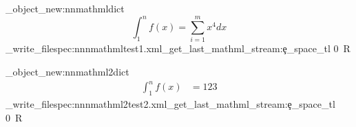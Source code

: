 \documentclass{article}
\begin{document}
\ExplSyntaxOn
\pdf_object_new:nn{mathml}{dict}
\ExplSyntaxOff
{}
\[
  \int_1^n f(x) = \sum_{i=1}^m x^4 dx
\]
\ExplSyntaxOn
\edef\blub{\luamml_get_last_mathml_stream:e{}\c_space_tl 0~R}
\pdffile_write_filespec:nnn{mathml}{test1.xml}{\blub}
\tagmcend
\tagstructend
\ExplSyntaxOff

\ExplSyntaxOn
\pdf_object_new:nn{mathml2}{dict}
\ExplSyntaxOff
{}
\begin{align}
  \int_1^n f(x) &= 123
\end{align}
\ExplSyntaxOn
\edef\blub{\luamml_get_last_mathml_stream:e{}\c_space_tl 0~R}
\pdffile_write_filespec:nnn{mathml2}{test2.xml}{\blub}

\ExplSyntaxOff


\tagmcend
\tagstructend
\tagstructend
\end{document}

